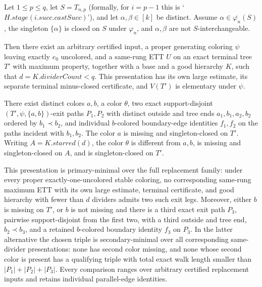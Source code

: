 \begin{lemma}
Let $1\leq p\leq q$, let
$S=T_{n,p}$ (formally, for $i=p-1$ this is
`$H.\mathit{stage}(i.\mathit{succ}.\mathit{castSucc})$'), and let
$\alpha,\beta\in[k]$ be distinct.  Assume
$\alpha\in\overline{\varphi_n}(S)$, the singleton $\{\alpha\}$ is closed
on $S$ under $\varphi_n$, and $\alpha,\beta$ are not
$S$-interchangeable.

Then there exist an arbitrary certified input, a proper
generating coloring $\psi$ leaving exactly $e_0$ uncolored, and a
same-rung ETT $U$ on an exact terminal tree $T'$ with maximum property,
together with a base and a good hierarchy $K$, such that
$d=K.\mathit{dividerCount}<q$.  This presentation has its own large
estimate, its separate terminal minus-closed certificate, and
$V(T')$ is elementary under $\psi$.

There exist distinct colors $a,b$, a color $\theta$, two exact
support-disjoint $(T',\psi,\{a,b\})$-exit paths $P_1,P_2$ with distinct
outside and tree ends $a_1,b_1,a_2,b_2$ ordered by $b_1\prec b_2$, and
individual $b$-colored boundary-edge identities $f_1,f_2$ on the paths
incident with $b_1,b_2$.  The color $a$ is missing and singleton-closed
on $T'$.  Writing $A=K.\mathit{starred}(d)$, the color $\theta$ is
different from $a,b$, is missing and singleton-closed on $A$, and is
singleton-closed on $T'$.

This presentation is primary-minimal over the full replacement family:
under every proper exactly-one-uncolored stable coloring, no
corresponding same-rung maximum ETT with its own large estimate,
terminal certificate, and good hierarchy with fewer than $d$ dividers
admits two such exit legs.  Moreover, either $b$ is missing on $T'$, or
$b$ is not missing and there is a third exact exit path $P_3$, pairwise
support-disjoint from the first two, with a third outside and tree end,
$b_2\prec b_3$, and a retained $b$-colored boundary identity $f_3$ on
$P_3$.  In the latter alternative the chosen triple is secondary-minimal
over all corresponding same-divider presentations: none has second
color missing, and none whose second color is present has a qualifying
triple with total exact walk length smaller than
$|P_1|+|P_2|+|P_3|$.  Every comparison ranges over arbitrary certified
replacement inputs and retains individual parallel-edge identities.
\end{lemma}
